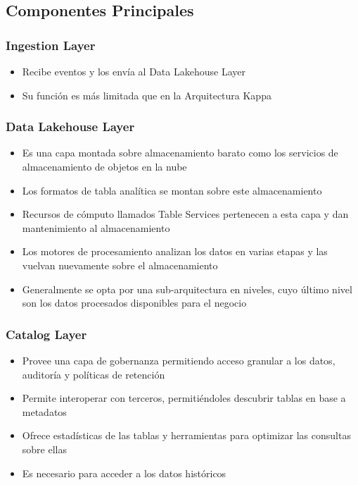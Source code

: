 \newpage
\subsection{Componentes Principales}

\subsubsection{Ingestion Layer}
\begin{itemize}
    \item Recibe eventos y los envía al Data Lakehouse Layer
    \item Su función es más limitada que en la Arquitectura Kappa
\end{itemize}

\subsubsection{Data Lakehouse Layer}
\begin{itemize}
    \item Es una capa montada sobre almacenamiento barato como los servicios de almacenamiento de objetos en la nube
    \item Los formatos de tabla analítica se montan sobre este almacenamiento
    \item Recursos de cómputo llamados Table Services pertenecen a esta capa y dan mantenimiento al almacenamiento 
    \item Los motores de procesamiento analizan los datos en varias etapas y las vuelvan nuevamente sobre el almacenamiento
    \item Generalmente se opta por una sub-arquitectura en niveles, cuyo último nivel son los datos procesados disponibles para el negocio
\end{itemize}

\subsubsection{Catalog Layer}
\begin{itemize}
    \item Provee una capa de gobernanza permitiendo acceso granular a los datos, auditoría y políticas de retención
    \item Permite interoperar con terceros, permitiéndoles descubrir tablas en base a metadatos
    \item Ofrece estadísticas de las tablas y herramientas para optimizar las consultas sobre ellas
    \item Es necesario para acceder a los datos históricos
\end{itemize}

